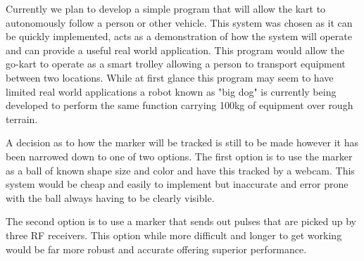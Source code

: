 Currently we plan to develop a simple program that will allow the kart to autonomously follow a person or other vehicle. This system was chosen as it can be quickly implemented, acts as a demonstration of how the system will operate and can provide a useful real world application. This program would allow the go-kart to operate as a smart trolley allowing a person to transport equipment between two locations. While at first glance this program may seem to have limited real world applications a robot known as "big dog" is currently being developed to perform the same function carrying 100kg of equipment over rough terrain.

A decision as to how the marker will be tracked is still to be made however it has been narrowed down to one of two options. The first option is to use the marker as a ball of known shape size and color and have this tracked by a webcam. This system would be cheap and easily to implement but inaccurate and error prone with the ball always having to be clearly visible.

The second option is to use a marker that sends out pulses that are picked up by three RF receivers. This option while more difficult and longer to get working would be far more robust and accurate offering superior performance.


